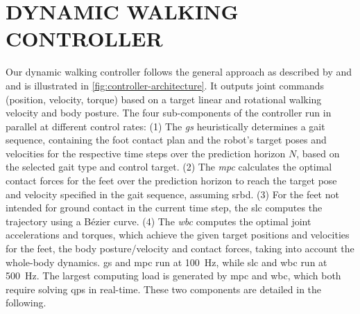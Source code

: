 \section{DYNAMIC WALKING CONTROLLER}%
\label{sec:dynamic_walking}

Our dynamic walking controller follows the general approach as described by \cite{di_carlo_dynamic_2018} and \cite{kim_highly_2019} and is illustrated in \autoref{fig:controller-architecture}. 
It outputs joint commands (position, velocity, torque) based on a target linear and rotational walking velocity and body posture.
The four sub-components of the controller run in parallel at different control rates: 
(1) The \textit{\gls{gs}} heuristically determines a gait sequence, containing the foot contact plan and the robot's target poses and velocities for the respective time steps over the prediction horizon $N$, 
based on the 
selected gait type and control target.
(2) The \textit{\gls{mpc}} calculates the optimal contact forces for the feet over the prediction horizon to reach the target pose and velocity specified in the gait sequence, assuming \gls{srbd}. 
(3) For the feet not intended for ground contact in the current time step, the \gls{slc} computes the trajectory using a Bézier curve.
(4) The \textit{\gls{wbc}} computes the optimal joint accelerations and torques, which achieve the given target positions and velocities for the feet, the body posture/velocity and contact forces, taking into account the whole-body dynamics.
\gls{gs} and \gls{mpc} run at \qty{100}{\Hz}, while \gls{slc} and \gls{wbc} run at \qty{500}{\Hz}.
The largest computing load is generated by \gls{mpc} and \gls{wbc}, which both require solving \glspl{qp} in real-time. These two components are detailed in the following.

